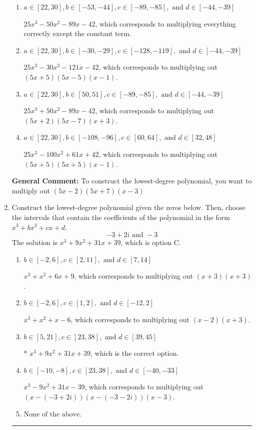 \documentclass{extbook}[14pt]
\newcommand{\litem}[1]{\item #1

\rule{\textwidth}{0.4pt}}
\begin{document}
\begin{enumerate}
{\begin{enumerate}[label=\Alph*.]
* $25x^{3} -50 x^{2} -89 x + 42$, which is the correct option.
\item \( a \in [22, 30], b \in [-53, -44], c \in [-89, -85], \text{ and } d \in [-44, -39] \)

$25x^{3} -50 x^{2} -89 x -42$, which corresponds to multiplying everything correctly except the constant term.
\item \( a \in [22, 30], b \in [-30, -29], c \in [-128, -119], \text{ and } d \in [-44, -39] \)

$25x^{3} -30 x^{2} -121 x -42$, which corresponds to multiplying out $(5x + 5)(5x -5)(x -1)$.
\item \( a \in [22, 30], b \in [50, 51], c \in [-89, -85], \text{ and } d \in [-44, -39] \)

$25x^{3} +50 x^{2} -89 x -42$, which corresponds to multiplying out $(5x + 2)(5x -7)(x + 3)$.
\item \( a \in [22, 30], b \in [-108, -96], c \in [60, 64], \text{ and } d \in [32, 48] \)

$25x^{3} -100 x^{2} +61 x + 42$, which corresponds to multiplying out $(5x + 5)(5x + 5)(x -1)$.
\end{enumerate}

\textbf{General Comment:} To construct the lowest-degree polynomial, you want to multiply out $(5x -2)(5x + 7)(x -3)$
}
\litem{
Construct the lowest-degree polynomial given the zeros below. Then, choose the intervals that contain the coefficients of the polynomial in the form $x^3+bx^2+cx+d$.
\[ -3 + 2 i \text{ and } -3 \]
The solution is \( x^{3} +9 x^{2} +31 x + 39 \), which is option C.\begin{enumerate}[label=\Alph*.]
\item \( b \in [-2, 6], c \in [2, 11], \text{ and } d \in [7, 14] \)

$x^{3} + x^{2} +6 x + 9$, which corresponds to multiplying out $(x + 3)(x + 3)$.
\item \( b \in [-2, 6], c \in [1, 2], \text{ and } d \in [-12, 2] \)

$x^{3} + x^{2} +x -6$, which corresponds to multiplying out $(x -2)(x + 3)$.
\item \( b \in [5, 21], c \in [23, 38], \text{ and } d \in [39, 45] \)

* $x^{3} +9 x^{2} +31 x + 39$, which is the correct option.
\item \( b \in [-10, -8], c \in [23, 38], \text{ and } d \in [-40, -33] \)

$x^{3} -9 x^{2} +31 x -39$, which corresponds to multiplying out $(x-(-3 + 2 i))(x-(-3 - 2 i))(x -3)$.
\item \( \text{None of the above.} \)


\end{enumerate}}
\end{enumerate}
\end{document}
